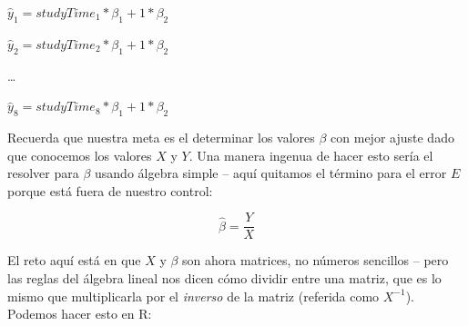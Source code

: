 \documentclass[
  12pt,
]{book}
\newenvironment{Shaded}{\begin{snugshade}}{\end{snugshade}}
\newcommand{\AttributeTok}[1]{\textcolor[rgb]{0.77,0.63,0.00}{#1}}
\newcommand{\CommentTok}[1]{\textcolor[rgb]{0.56,0.35,0.01}{\textit{#1}}}
\newcommand{\DecValTok}[1]{\textcolor[rgb]{0.00,0.00,0.81}{#1}}
\newcommand{\FunctionTok}[1]{\textcolor[rgb]{0.00,0.00,0.00}{#1}}
\newcommand{\NormalTok}[1]{#1}
\newcommand{\OtherTok}[1]{\textcolor[rgb]{0.56,0.35,0.01}{#1}}
\newcommand{\SpecialCharTok}[1]{\textcolor[rgb]{0.00,0.00,0.00}{#1}}
\begin{document}
\(\hat{y}_1 = studyTime_1*\beta_1 + 1*\beta_2\)

\(\hat{y}_2 = studyTime_2*\beta_1 + 1*\beta_2\)

\ldots{}

\(\hat{y}_8 = studyTime_8*\beta_1 + 1*\beta_2\)

Recuerda que nuestra meta es el determinar los valores \(\beta\) con mejor ajuste dado que conocemos los valores \(X\) y \(Y\). Una manera ingenua de hacer esto sería el resolver para \(\beta\) usando álgebra simple -- aquí quitamos el término para el error \(E\) porque está fuera de nuestro control:

\[
\hat{\beta} = \frac{Y}{X}
\]

El reto aquí está en que \(X\) y \(\beta\) son ahora matrices, no números sencillos -- pero las reglas del álgebra lineal nos dicen cómo dividir entre una matriz, que es lo mismo que multiplicarla por el \emph{inverso} de la matriz (referida como \(X^{-1}\)). Podemos hacer esto en R:

\begin{Shaded}
\end{Shaded}
\end{document}
